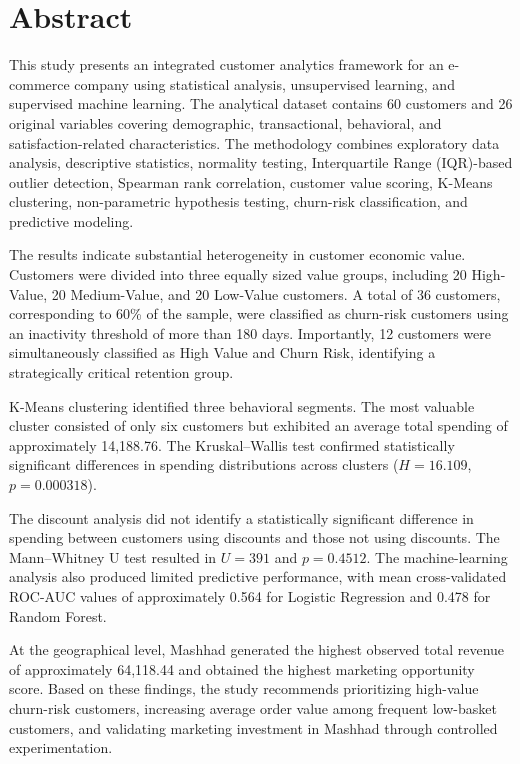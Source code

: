 \documentclass[11pt,a4paper]{article}
\begin{document}
\section*{Abstract}

This study presents an integrated customer analytics framework for an e-commerce company using statistical analysis, unsupervised learning, and supervised machine learning. The analytical dataset contains 60 customers and 26 original variables covering demographic, transactional, behavioral, and satisfaction-related characteristics. The methodology combines exploratory data analysis, descriptive statistics, normality testing, Interquartile Range (IQR)-based outlier detection, Spearman rank correlation, customer value scoring, K-Means clustering, non-parametric hypothesis testing, churn-risk classification, and predictive modeling.

The results indicate substantial heterogeneity in customer economic value. Customers were divided into three equally sized value groups, including 20 High-Value, 20 Medium-Value, and 20 Low-Value customers. A total of 36 customers, corresponding to 60\% of the sample, were classified as churn-risk customers using an inactivity threshold of more than 180 days. Importantly, 12 customers were simultaneously classified as High Value and Churn Risk, identifying a strategically critical retention group.

K-Means clustering identified three behavioral segments. The most valuable cluster consisted of only six customers but exhibited an average total spending of approximately 14,188.76. The Kruskal--Wallis test confirmed statistically significant differences in spending distributions across clusters ($H=16.109$, $p=0.000318$).

The discount analysis did not identify a statistically significant difference in spending between customers using discounts and those not using discounts. The Mann--Whitney U test resulted in $U=391$ and $p=0.4512$. The machine-learning analysis also produced limited predictive performance, with mean cross-validated ROC-AUC values of approximately 0.564 for Logistic Regression and 0.478 for Random Forest.

At the geographical level, Mashhad generated the highest observed total revenue of approximately 64,118.44 and obtained the highest marketing opportunity score. Based on these findings, the study recommends prioritizing high-value churn-risk customers, increasing average order value among frequent low-basket customers, and validating marketing investment in Mashhad through controlled experimentation.
\end{document}
